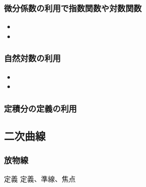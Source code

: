 \documentclass[10pt,dvipdfmx]{jsarticle}
\newcommand{\answer}[2]{{\color{orange}#2}}
\newcommand{\answer}[2]{\vspace{#1mm}}
\begin{document}
\subsubsection*{微分係数の利用で指数関数や対数関数}
\begin{Large}
  \begin{itemize}
    \item \item
  \end{itemize}
\end{Large}

\subsubsection*{自然対数の利用}
\begin{Large}
  \begin{itemize}
    \item
    \item
  \end{itemize}
\end{Large}

\subsubsection*{定積分の定義の利用}
\vspace{15mm}

\newpage
\subsection*{二次曲線}
\subsubsection*{放物線}
\begin{itembox}[l]{定義}
  \answer{8}{定義、準線、焦点}
\end{itembox}
\end{document}
